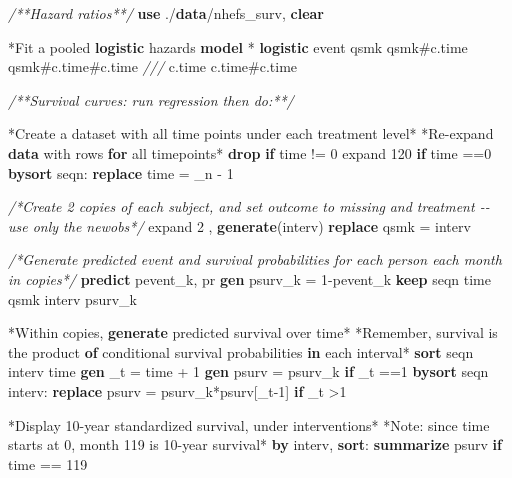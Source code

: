 \documentclass[
  10pt,
]{book}
\newenvironment{Shaded}{\begin{snugshade}}{\end{snugshade}}
\newcommand{\BaseNTok}[1]{\textcolor[rgb]{0.00,0.00,0.81}{#1}}
\newcommand{\CommentTok}[1]{\textcolor[rgb]{0.56,0.35,0.01}{\textit{#1}}}
\newcommand{\DataTypeTok}[1]{\textcolor[rgb]{0.13,0.29,0.53}{#1}}
\newcommand{\DecValTok}[1]{\textcolor[rgb]{0.00,0.00,0.81}{#1}}
\newcommand{\FunctionTok}[1]{\textcolor[rgb]{0.00,0.00,0.00}{#1}}
\newcommand{\KeywordTok}[1]{\textcolor[rgb]{0.13,0.29,0.53}{\textbf{#1}}}
\newcommand{\NormalTok}[1]{#1}
\newcommand{\OtherTok}[1]{\textcolor[rgb]{0.56,0.35,0.01}{#1}}
\begin{document}
\begin{Shaded}
\begin{Highlighting}[]
\CommentTok{/**Hazard ratios**/}
\KeywordTok{use}\NormalTok{ ./}\KeywordTok{data}\NormalTok{/nhefs\_surv, }\KeywordTok{clear}

\NormalTok{*Fit a pooled }\KeywordTok{logistic}\NormalTok{ hazards }\KeywordTok{model}\NormalTok{ *}
\KeywordTok{logistic}\NormalTok{ event qsmk qsmk\#c.time qsmk\#c.time\#c.time }\CommentTok{///}
\NormalTok{  c.time c.time\#c.time }

\CommentTok{/**Survival curves: run regression then do:**/}

\NormalTok{*Create a dataset with }\OtherTok{all}\NormalTok{ time points under each treatment }\DecValTok{level}\NormalTok{*}
\NormalTok{*Re{-}expand }\KeywordTok{data}\NormalTok{ with }\BaseNTok{rows} \KeywordTok{for} \OtherTok{all}\NormalTok{ timepoints*}
\KeywordTok{drop} \KeywordTok{if}\NormalTok{ time != 0}
\NormalTok{expand 120 }\KeywordTok{if}\NormalTok{ time ==0 }
\KeywordTok{bysort}\NormalTok{ seqn: }\KeywordTok{replace}\NormalTok{ time = }\DataTypeTok{\_n}\NormalTok{ {-} 1   }
        
\CommentTok{/*Create 2 copies of each subject, and set outcome to missing }
\CommentTok{and treatment {-}{-} use only the newobs*/}
\NormalTok{expand 2 , }\KeywordTok{generate}\NormalTok{(interv) }
\KeywordTok{replace}\NormalTok{ qsmk = interv   }

\CommentTok{/*Generate predicted event and survival probabilities }
\CommentTok{for each person each month in copies*/}
\KeywordTok{predict}\NormalTok{ pevent\_k, pr}
\KeywordTok{gen}\NormalTok{ psurv\_k = 1{-}pevent\_k}
\KeywordTok{keep}\NormalTok{ seqn time qsmk interv psurv\_k }

\NormalTok{*Within copies, }\KeywordTok{generate}\NormalTok{ predicted survival }\BaseNTok{over}\NormalTok{ time*}
\NormalTok{*Remember, survival is the product }\KeywordTok{of}\NormalTok{ conditional survival probabilities }\KeywordTok{in}\NormalTok{ each interval*  }
\KeywordTok{sort}\NormalTok{ seqn interv time}
\KeywordTok{gen}\NormalTok{ \_t = time + 1}
\KeywordTok{gen}\NormalTok{ psurv = psurv\_k }\KeywordTok{if}\NormalTok{ \_t ==1       }
\KeywordTok{bysort}\NormalTok{ seqn interv: }\KeywordTok{replace}\NormalTok{ psurv = psurv\_k*psurv[\_t{-}1] }\KeywordTok{if}\NormalTok{ \_t \textgreater{}1 }

\NormalTok{*Display 10{-}}\FunctionTok{year}\NormalTok{ standardized survival, under interventions*}
\NormalTok{*Note: since time starts }\FunctionTok{at}\NormalTok{ 0, }\FunctionTok{month}\NormalTok{ 119 is 10{-}}\FunctionTok{year}\NormalTok{ survival*}
\KeywordTok{by}\NormalTok{ interv, }\KeywordTok{sort}\NormalTok{: }\KeywordTok{summarize}\NormalTok{ psurv }\KeywordTok{if}\NormalTok{ time == 119}


\end{Highlighting}
\end{Shaded}
\end{document}
